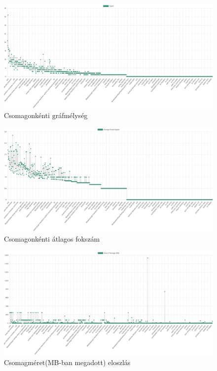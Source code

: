 \begin{figure}[!h]
	\centering
	\includegraphics[scale=0.12]{images/graphdepth.png}
	\caption{Csomagonkénti gráfmélység}
	\label{fig:graphdepth}
\end{figure}

\begin{figure}[!h]
	\centering
	\includegraphics[scale=0.12]{images/avgdegree.png}
	\caption{Csomagonkénti átlagos fokszám}
	\label{fig:avgdegree}
\end{figure}

\begin{figure}[!h]
	\centering
	\includegraphics[scale=0.12]{images/pkgsize.png}
	\caption{Csomagméret(MB-ban megadott) eloszlás}
	\label{fig:pkgsize}
\end{figure}

